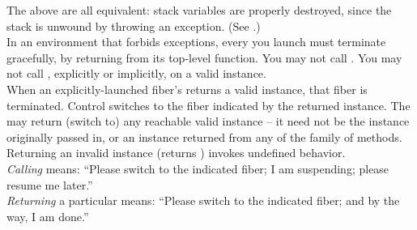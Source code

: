 The above are all equivalent: stack variables are properly destroyed, since
the stack is unwound by throwing an exception. (See .)\\

In an environment that forbids exceptions, every \fiber you launch must
terminate gracefully, by returning from its top-level function. You may not
call \unwindfib. You may not call \dtor, explicitly or implicitly, on a
valid \fiber instance.\\

When an explicitly-launched fiber's \entryfn\xspace returns a valid \fiber
instance, that fiber is terminated. Control switches to the fiber indicated by
the returned \fiber instance. The \entryfn\xspace may return (switch to) any
reachable valid \fiber instance -- it need not be the instance originally
passed in, or an instance returned from any of the \resume family of
methods.\\

Returning an invalid \fiber instance (\opbool returns ) invokes
undefined behavior.\\

\emph{Calling} \resume means: ``Please switch to the indicated fiber; I
am suspending; please resume me later.''\\

\emph{Returning} a particular \fiber means: ``Please switch to the indicated
fiber; and by the way, I am done.''
